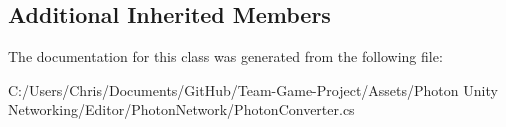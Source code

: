 \subsection*{Additional Inherited Members}


The documentation for this class was generated from the following file\+:\begin{DoxyCompactItemize}
\item 
C\+:/\+Users/\+Chris/\+Documents/\+Git\+Hub/\+Team-\/\+Game-\/\+Project/\+Assets/\+Photon Unity Networking/\+Editor/\+Photon\+Network/Photon\+Converter.\+cs\end{DoxyCompactItemize}
